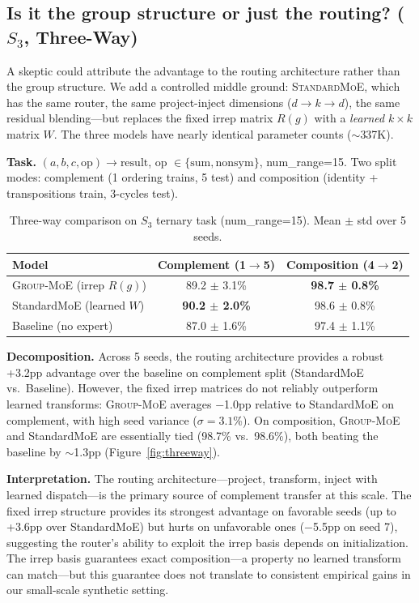 \documentclass[10pt, letterpaper]{article}
\newcommand{\Rg}{R(g)}
\newcommand{\gmoe}{\textsc{Group-MoE}}
\begin{document}
\subsection{Is it the group structure or just the routing? ($S_3$, Three-Way)}
\label{sec:exp-threeway}

A skeptic could attribute the advantage to the routing architecture rather than the group structure. We add a controlled middle ground: \textsc{StandardMoE}, which has the same router, the same project-inject dimensions ($d \to k \to d$), the same residual blending---but replaces the fixed irrep matrix $\Rg$ with a \emph{learned} $k \times k$ matrix $W$. The three models have nearly identical parameter counts ($\sim$337K).

\textbf{Task.} $(a, b, c, \text{op}) \to \text{result}$, op $\in \{\text{sum}, \text{nonsym}\}$, num\_range=15. Two split modes: complement (1 ordering trains, 5 test) and composition (identity + transpositions train, 3-cycles test).

\begin{table}[h]
\centering
\caption{Three-way comparison on $S_3$ ternary task (num\_range=15). Mean $\pm$ std over 5 seeds.}
\label{tab:threeway}
\begin{tabular}{lcc}
\toprule
Model & Complement (1$\to$5) & Composition (4$\to$2) \\
\midrule
\gmoe{} (irrep $\Rg$) & 89.2 $\pm$ 3.1\% & \textbf{98.7 $\pm$ 0.8\%} \\
StandardMoE (learned $W$) & \textbf{90.2 $\pm$ 2.0\%} & 98.6 $\pm$ 0.8\% \\
Baseline (no expert) & 87.0 $\pm$ 1.6\% & 97.4 $\pm$ 1.1\% \\
\bottomrule
\end{tabular}
\end{table}

\textbf{Decomposition.} Across 5 seeds, the routing architecture provides a robust +3.2pp advantage over the baseline on complement split (StandardMoE vs.\ Baseline). However, the fixed irrep matrices do not reliably outperform learned transforms: \gmoe{} averages $-$1.0pp relative to StandardMoE on complement, with high seed variance ($\sigma = 3.1$\%). On composition, \gmoe{} and StandardMoE are essentially tied (98.7\% vs.\ 98.6\%), both beating the baseline by ${\sim}$1.3pp (Figure~\ref{fig:threeway}).

\textbf{Interpretation.} The routing architecture---project, transform, inject with learned dispatch---is the primary source of complement transfer at this scale. The fixed irrep structure provides its strongest advantage on favorable seeds (up to +3.6pp over StandardMoE) but hurts on unfavorable ones ($-$5.5pp on seed 7), suggesting the router's ability to exploit the irrep basis depends on initialization. The irrep basis guarantees exact composition---a property no learned transform can match---but this guarantee does not translate to consistent empirical gains in our small-scale synthetic setting.
\end{document}

